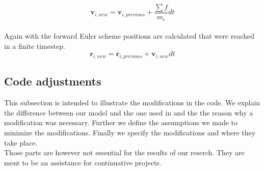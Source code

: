 \documentclass[11pt]{article}
\begin{document}
\begin{equation}
\mathbf{v}_{i,new} = \mathbf{v}_{i,previous} + \frac{\sum {f}}{m_{i}}dt
\end{equation}
\\
Again with the forward Euler scheme positions are calculated that were reached in a finite timestep.\\

\begin{equation}
\mathbf{r}_{i,new}=\mathbf{r}_{i,previous}+\mathbf{v}_{i,new}dt
\end{equation}

\subsection{Code adjustments}

This subsection is intended to illustrate the modifications in the code. We explain the difference between our model and the one used in \cite{Building} and the the reason why a modification was necessary. Further we define the assumptions we made to minimize the modifications. Finally we specify the modifications and where they take place. 
\\
Those parts are however not essential for the results of our reserch. They are ment to be an assistance for continuative projects.
\end{document}
